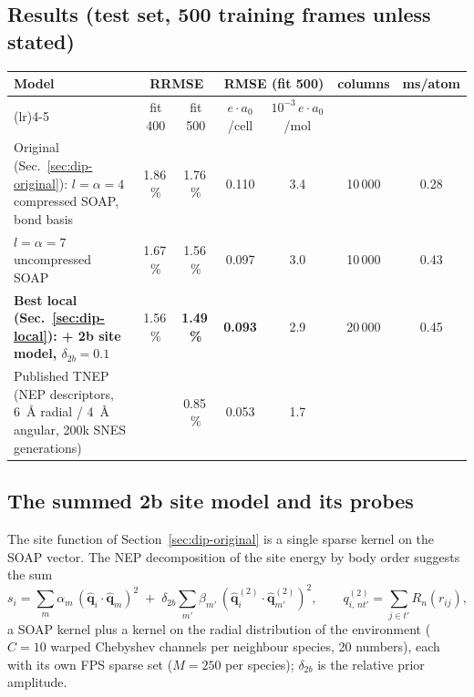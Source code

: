 \documentclass[11pt,a4paper]{article}
\begin{document}
\subsection{Results (test set, 500 training frames unless stated)}\label{sec:dip-results}

\begin{center}\footnotesize\setlength{\tabcolsep}{4pt}
\begin{tabular}{@{}>{\raggedright\arraybackslash}p{4.4cm}cccccc@{}}
\toprule
Model & \multicolumn{2}{c}{RRMSE} & \multicolumn{2}{c}{RMSE (fit 500)} & columns & ms/atom \\
\cmidrule(lr){2-3}\cmidrule(lr){4-5}
 & fit 400 & fit 500 & $e\cdot a_0$/cell & $10^{-3}\,e\cdot a_0$/mol & & \\
\midrule
Original (Sec.~\ref{sec:dip-original}): $l=\alpha=4$ compressed SOAP, bond basis & 1.86\,\% & 1.76\,\% & 0.110 & 3.4 & 10\,000 & 0.28 \\
$l=\alpha=7$ uncompressed SOAP & 1.67\,\% & 1.56\,\% & 0.097 & 3.0 & 10\,000 & 0.43 \\
\textbf{Best local (Sec.~\ref{sec:dip-local}): + 2b site model, $\delta_{2b}=0.1$} & 1.56\,\% & \textbf{1.49\,\%} & \textbf{0.093} & 2.9 & 20\,000 & 0.45 \\
Published TNEP (NEP descriptors, 6~\AA{} radial / 4~\AA{} angular, 200k SNES generations) & & 0.85\,\% & 0.053 & 1.7 & & \\
\bottomrule
\end{tabular}
\end{center}

\subsection{The summed 2b site model and its probes}\label{sec:2b}

The site function of Section~\ref{sec:dip-original} is a single sparse kernel on the SOAP vector. The
NEP decomposition of the site energy by body order suggests the sum
\begin{equation}
s_i = \sum_m \alpha_m\,(\hat{\mathbf q}_i\cdot\hat{\mathbf q}_m)^{2}
\;+\;\delta_{2b}\sum_{m'} \beta_{m'}\,(\hat{\mathbf q}^{(2)}_i\cdot\hat{\mathbf q}^{(2)}_{m'})^{2},
\qquad
q^{(2)}_{i,\,n t'} = \sum_{j\in t'} R_n(r_{ij}),
\label{eq:2b-site}
\end{equation}
a SOAP kernel plus a kernel on the radial distribution of the environment ($C=10$ warped Chebyshev
channels per neighbour species, 20 numbers), each with its own FPS sparse set ($M=250$ per
species); $\delta_{2b}$ is the relative prior amplitude.
\end{document}
